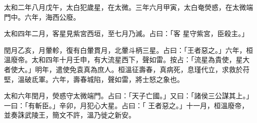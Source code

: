 \begin{pinyinscope}
 太和二年八月戊午，太白犯歲星，在太微。三年六月甲寅，太白奄熒惑，在太微端門中。六年，海西公廢。



 太和四年二月，客星見紫宮西垣，至七月乃滅。占曰：「客
 星守紫宮，臣殺主。」



 閏月乙亥，月暈軫，復有白暈貫月，北暈斗柄三星。占曰：「王者惡之。」六年，桓溫廢帝。太和四年十月壬申，有大流星西下，聲如雷。按占：「流星為貴使，星大者使大。」明年，遣使免袁真為庶人。桓溫征壽春，真病死，息瑾代立，求救於苻堅，溫破氐軍。六年，壽春城陷，聲如雷，將士怒之象也。



 太和六年閏月，熒惑守太微端門。占曰：「天子亡國。」又曰：「諸侯三公謀其上。」一曰：「有斬臣。」辛卯，月犯心大星。占曰：「
 王者惡之。」十一月，桓溫廢帝，並奏誅武陵王，簡文不許，溫乃徙之新安。



\end{pinyinscope}